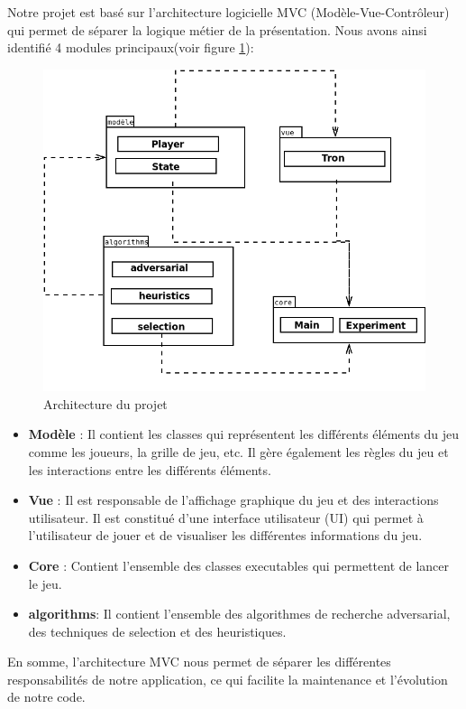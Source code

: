 Notre projet est basé sur l'architecture logicielle MVC (Modèle-Vue-Contrôleur) qui permet de séparer la logique métier de la présentation.
Nous avons ainsi identifié 4 modules principaux(voir figure \ref{fig:architecture}):
\begin{figure}[H]
	\centering
	\includegraphics[scale=0.4]{diagrames/architecture}
	\caption{Architecture du projet}
	\label{fig:architecture}
\end{figure}

\begin{itemize}
	\item \textbf{Modèle} : Il contient les classes qui représentent les différents éléments du jeu comme les joueurs, la grille de jeu, etc. Il gère également les règles du jeu et les interactions entre les différents éléments.
	\item \textbf{Vue} : Il est responsable de l'affichage graphique du jeu et des interactions utilisateur. Il est constitué d'une interface utilisateur (UI) qui permet à l'utilisateur de jouer et de visualiser les différentes informations du jeu.
	\item \textbf{Core} : Contient l'ensemble des classes executables qui permettent de lancer le jeu.
	\item \textbf{algorithms}: Il contient l'ensemble des algorithmes de recherche adversarial, des techniques de selection et des heuristiques.
\end{itemize}
En somme, l'architecture MVC nous permet de séparer les différentes responsabilités de notre application, ce qui facilite la maintenance et l'évolution de notre code.
